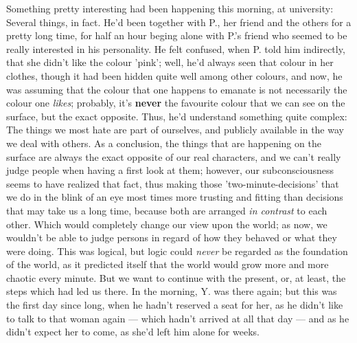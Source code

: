 Something pretty interesting had been happening this morning, at university: Several things, in fact. He'd been together with P., her friend and the others for a pretty long time, for half an hour beging alone with P.'s friend who seemed to be really interested in his personality. He felt confused, when P. told him indirectly, that she didn't like the colour 'pink'; well, he'd always seen that colour in her clothes, though it had been hidden quite well among other colours, and now, he was assuming that the colour that one happens to emanate is not necessarily the colour one \emph{likes}; probably, it's \textbf{never} the favourite colour that we can see on the surface, but the exact opposite. Thus, he'd understand something quite complex: The things we most hate are part of ourselves, and publicly available in the way we deal with others. As a conclusion, the things that are happening on the surface are always the exact opposite of our real characters, and we can't really judge people when having a first look at them; however, our subconsciousness seems to have realized that fact, thus making those 'two-minute-decisions' that we do in the blink of an eye most times more trusting and fitting than decisions that may take us a long time, because both are arranged \emph{in contrast} to each other. Which would completely change our view upon the world; as now, we wouldn't be able to judge persons in regard of how they behaved or what they were doing. This was logical, but logic could \emph{never} be regarded as the foundation of the world, as it predicted itself that the world would grow more and more chaotic every minute. 
But we want to continue with the present, or, at least, the steps which had led us there. In the morning, Y. was there again; but this was the first day since long, when he hadn't reserved a seat for her, as he didn't like to talk to that woman again --- which hadn't arrived at all that day --- and as he didn't expect her to come, as she'd left him alone for weeks. 
